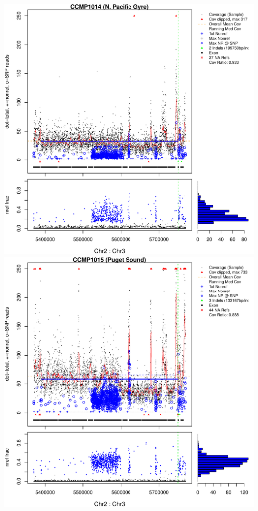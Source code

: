 \documentclass{article}\usepackage[]{graphicx}\usepackage[]{color}
\makeatletter
\def\maxwidth{ %
  \ifdim\Gin@nat@width>\linewidth
    \linewidth
  \else
    \Gin@nat@width
  \fi
}
\newenvironment{knitrout}{}{} %
\makeatother
\begin{document}
\begin{knitrout}
{\includegraphics[width=\maxwidth]{figs-knitr/unnamed-chunk-37-5} 
\includegraphics[width=\maxwidth]{figs-knitr/unnamed-chunk-37-6} 
}
\end{knitrout}
\end{document}
